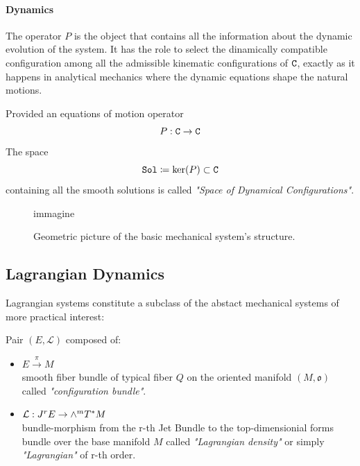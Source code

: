 \documentclass[Main]{subfiles}
\begin{document}
	\paragraph{Dynamics}
	The operator $P$ is the object that contains all the information about the dynamic evolution of the system.
	It has the role to select the dinamically compatible configuration among all the admissible kinematic configurations of $\mathtt{C}$, exactly as it happens in analytical mechanics where the dynamic equations shape the natural motions.
	\begin{notationfix}
		Provided an equations of motion operator
		\begin{displaymath}
			P: \mathtt{C} \rightarrow \mathtt{C}
		\end{displaymath}
		The space
		\begin{displaymath}
		\mathtt{Sol} \coloneqq \ker(P) \subset \mathtt{C}
		\end{displaymath}
		containing all the smooth solutions is called \emph{"Space of Dynamical Configurations"}.
	\end{notationfix}
	
	\begin{figure}[h!]
 	 	\caption{Geometric picture of the basic mechanical system's structure.}
 	 	\danger immagine
  		\centering
	\end{figure}	
	
	\subsection{Lagrangian Dynamics}	
	Lagrangian systems constitute a subclass of the abstact mechanical systems of more practical interest:	
		\begin{definition}
	Pair $(E, \mathcal{L} )$ composed of:
		\begin{itemize}
			\item $E \xrightarrow{\pi} M$ \\smooth fiber bundle of typical fiber $Q$ on the oriented manifold $(M,\mathfrak{o})$ called \emph{"configuration bundle"}.
			\item	$ \mathcal{L} : J^r E \rightarrow \wedge^m T^*M$ \\bundle-morphism from the r-th Jet Bundle to  the top-dimensionial forms bundle over the base manifold $M$  called \emph{"Lagrangian density"} or simply \emph{"Lagrangian"} of r-th order.
		\end{itemize}
	\end{definition}	
	
\end{document}
